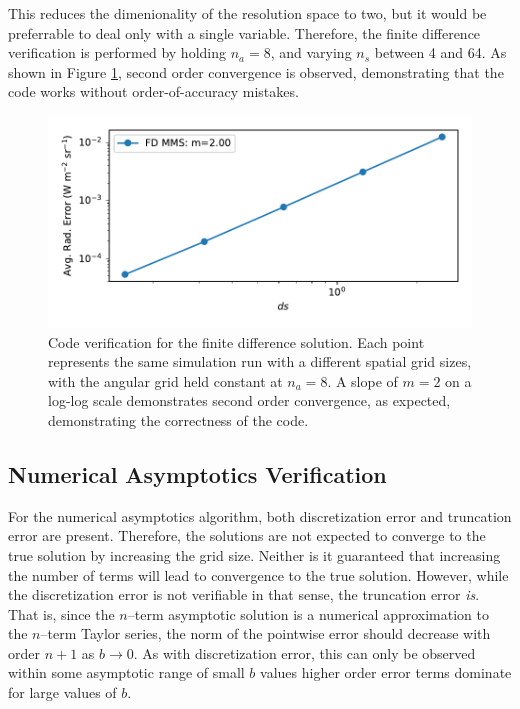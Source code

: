 \documentclass[ms,cpyr,lof,lot]{uathesis}
\begin{document}
This reduces the dimenionality of the resolution space to two, but it would be preferrable to deal only with a single variable.
Therefore, the finite difference verification is performed by holding $n_a=8$, and varying $n_s$ between 4 and 64.
As shown in Figure \ref{fig:fd_mms}, second order convergence is observed, demonstrating that the code works without order-of-accuracy mistakes.

\begin{figure}[h]
  \centering
  \includegraphics[width=5in]{fd_mms}
  \caption{Code verification for the finite difference solution. Each point represents the same simulation run with a different spatial grid sizes, with the angular grid held constant at $n_a=8$. A slope of $m=2$ on a log-log scale demonstrates second order convergence, as expected, demonstrating the correctness of the code.}
  \label{fig:fd_mms}
\end{figure}

\subsection{Numerical Asymptotics Verification}
\label{sec:num_asym_mms}
For the numerical asymptotics algorithm, both discretization error and truncation error are present.
Therefore, the solutions are not expected to converge to the true solution by increasing the grid size.
Neither is it guaranteed that increasing the number of terms will lead to convergence to the true solution.
However, while the discretization error is not verifiable in that sense, the truncation error \textit{is}.
That is, since the $n$--term asymptotic solution is a numerical approximation to the $n$--term Taylor series, the norm of the pointwise error should decrease with order $n+1$ as $b \to 0$.
As with discretization error, this can only be observed within some asymptotic range of small $b$ values higher order error terms dominate for large values of $b$.
\end{document}
